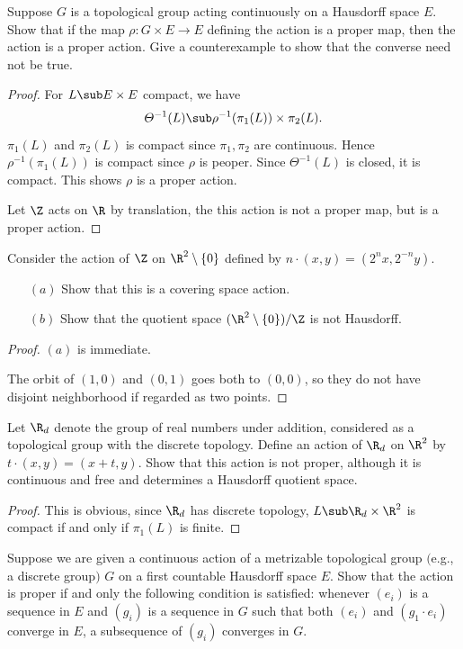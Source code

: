 \begin{exercise}
Suppose $G$ is a topological group acting continuously on a Hausdorff space $E$. Show that if the map $\rho:G\times E\to E$ defining the action is a proper map, then the action is a proper action. Give a counterexample to show that the converse need not be true.
\end{exercise}
\begin{proof}
For $L\sub E\times E$ compact, we have
\[\varTheta^{-1}(L)\sub\rho^{-1}(\pi_1(L))\times\pi_2(L).\]
$\pi_1(L)$ and $\pi_2(L)$ is compact since $\pi_1,\pi_2$ are continuous. Hence $\rho^{-1}(\pi_1(L))$ is compact since $\rho$ is peoper. Since $\varTheta^{-1}(L)$ is closed, it is compact. This shows $\rho$ is a proper action.\par
Let $\Z$ acts on $\R$ by translation, the this action is not a proper map, but is a proper action.
\end{proof}
\begin{exercise}
Consider the action of $\Z$ on $\R^2\setminus\{0\}$ defined by $n\cdot(x,y)=(2^nx,2^{-n}y)$.
\begin{itemize}
\item[$(a)$]Show that this is a covering space action.
\item[$(b)$]Show that the quotient space $(\R^2\setminus\{0\})/\Z$ is not Hausdorff.
\end{itemize}
\end{exercise}
\begin{proof}
$(a)$ is immediate.\par
The orbit of $(1,0)$ and $(0,1)$ goes both to $(0,0)$, so they do not have disjoint neighborhood if regarded as two points.
\end{proof}
\begin{exercise}
Let $\R_d$ denote the group of real numbers under addition, considered as a topological group with the discrete topology. Define an action of $\R_d$ on $\R^2$ by $t\cdot(x,y)=(x+t,y)$. Show that this action is not proper, although it is continuous and free and determines a Hausdorff quotient space.
\end{exercise}
\begin{proof}
This is obvious, since $\R_d$ has discrete topology, $L\sub \R_d\times\R^2$ is compact if and only if $\pi_1(L)$ is finite.
\end{proof}
\begin{exercise}
Suppose we are given a continuous action of a metrizable topological group $($e.g., a discrete group$)$ $G$ on a first countable Hausdorff space $E$. Show that the action is proper if and only the following condition is satisfied: whenever $(e_i)$ is a sequence in $E$ and $(g_i)$ is a sequence in $G$ such that both $(e_i)$ and $(g_1\cdot e_i)$ converge in $E$, a subsequence of $(g_i)$ converges in $G$.
\end{exercise}
